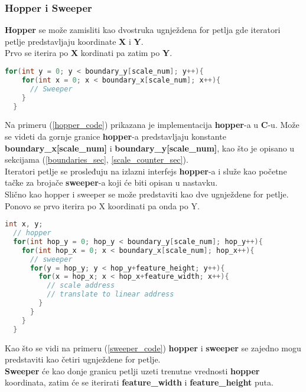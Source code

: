 \subsubsection{Hopper i Sweeper}\label{hopper_sec}
\textbf{Hopper} se može zamisliti kao dvostruka ugnježdena for petlja gde
iteratori petlje predstavljaju koordinate \textbf{X} i \textbf{Y}. \\
Prvo se iterira po \textbf{X} kordinati pa zatim po \textbf{Y}.

\begin{lstlisting}[language=C++,caption={Primer \textbf{hopper}-a u \textbf{C}-u},captionpos=b, label=hopper_code]
  for(int y = 0; y < boundary_y[scale_num]; y++){
    for(int x = 0; x < boundary_x[scale_num]; x++){
      // Sweeper
    }
  }
\end{lstlisting}

Na primeru (\ref{hopper_code}) prikazana je implementacija \textbf{hopper}-a u
\textbf{C}-u.
Može se videti da gornje granice \textbf{hopper}-a predstavljaju konstante
\textbf{boundary\_x[scale\_num]} i \textbf{boundary\_y[scale\_num]}, kao što je
opisano u sekcijama (\ref{boundaries_sec},
\ref{scale_counter_sec}). \\

Iteratori petlje se prosleđuju na izlazni interfejs \textbf{hopper}-a i služe
kao početne tačke za brojače \textbf{sweeper}-a koji će biti opisan u nastavku. \\

Slično kao hopper i sweeper se može predstaviti kao dve ugnježdene for petlje. \\
Ponovo se prvo iterira po X koordinati pa onda po Y.

\begin{lstlisting}[language=C++,caption={Primer \textbf{hopper}-a i \textbf{sweeper}-a u \textbf{C}-u},captionpos=b, label=sweeper_code]
  int x, y;
  // hopper
  for(int hop_y = 0; hop_y < boundary_y[scale_num]; hop_y++){
    for(int hop_x = 0; x < boundary_x[scale_num]; hop_x++){
      // sweeper
      for(y = hop_y; y < hop_y+feature_height; y++){
        for(x = hop_x; x < hop_x+feature_width; x++){
          // scale address
          // translate to linear address
        }
      }
    }
  }
\end{lstlisting}

Kao što se vidi na primeru (\ref{sweeper_code}) \textbf{hopper} i \textbf{sweeper} se zajedno mogu
predstaviti kao četiri ugnježdene for petlje. \\
\textbf{Sweeper} će kao donje granicu petlji uzeti trenutne vrednosti
\textbf{hopper} koordinata, zatim će se iterirati \textbf{feature\_width} i \textbf{feature\_height} puta. \\


